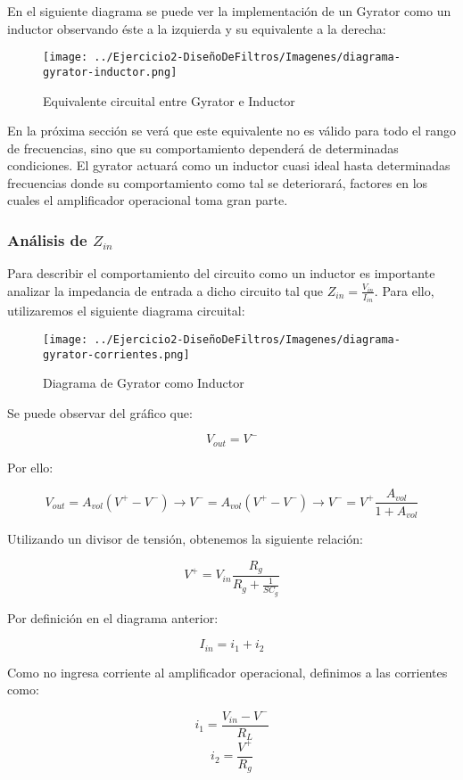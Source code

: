 En el siguiente diagrama se puede ver la implementación de un Gyrator como un inductor observando éste a la izquierda y su equivalente a la derecha:

\begin{figure}[H]
    \centering
    \texttt{[image: ../Ejercicio2-DiseñoDeFiltros/Imagenes/diagrama-gyrator-inductor.png]}
    \caption{Equivalente circuital entre Gyrator e Inductor}
\end{figure}

En la próxima sección se verá que este equivalente no es válido para todo el rango de frecuencias, sino que su comportamiento dependerá de 
determinadas condiciones. El gyrator actuará como un inductor cuasi ideal hasta determinadas frecuencias donde su comportamiento 
como tal se deteriorará, factores en los cuales el amplificador operacional toma gran parte.

\subsubsection{Análisis de $Z_{in}$}

Para describir el comportamiento del circuito como un inductor es importante 
analizar la impedancia de entrada a dicho circuito tal que $Z_{in}=\frac{V_{in}}{I_{in}}$. 
Para ello, utilizaremos el siguiente diagrama circuital:

\begin{figure}[H]
    \centering
    \texttt{[image: ../Ejercicio2-DiseñoDeFiltros/Imagenes/diagrama-gyrator-corrientes.png]}
    \caption{Diagrama de Gyrator como Inductor}
\end{figure}

Se puede observar del gráfico que:

$$V_{out}=V^-$$

Por ello:

$$V_{out}=A_{vol}(V^+-V^-) \longrightarrow V^-=A_{vol}(V^+-V^-) 
\longrightarrow V^-= V^+ \frac{A_{vol}}{1+A_{vol}}$$

Utilizando un divisor de tensión, obtenemos la siguiente relación:

$$V^+= V_{in}\frac{R_g}{R_g+\frac{1}{SC_g}}$$

Por definición en el diagrama anterior:

$$I_{in}=i_1+i_2$$

Como no ingresa corriente al amplificador operacional, definimos a las corrientes como:

$$i_1=\frac{V_{in}-V^-}{R_L}$$
$$i_2=\frac{V^+}{R_g}$$

